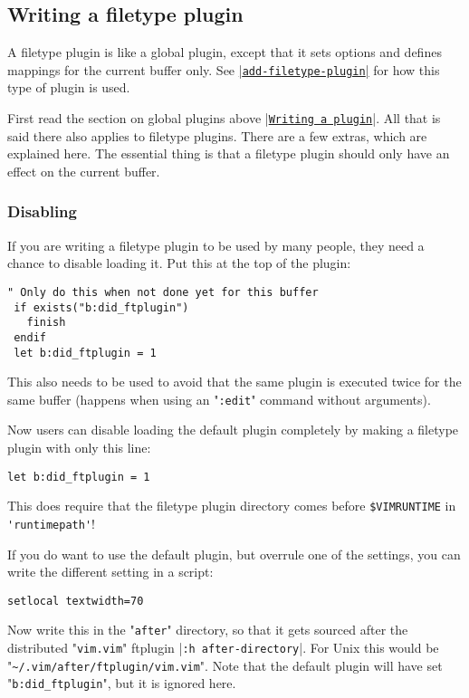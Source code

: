 \subsection{Writing a filetype plugin}
\label{write-filetype-plugin}
\label{ftplugin}
A filetype plugin is like a global plugin, except that it sets options and defines mappings for the current buffer only.
See \hyperref[add-filetype-plugin]{|\texttt{add-filetype-plugin}|} for how this type of plugin is used.

First read the section on global plugins above |\hyperref[Writing a plugin]{\texttt{Writing a plugin}}|.
All that is said there also applies to filetype plugins.
There are a few extras, which are explained here.
The essential thing is that a filetype plugin should only have an effect on the current buffer.

\subsubsection{Disabling}
If you are writing a filetype plugin to be used by many people, they need a chance to disable loading it.
Put this at the top of the plugin:

\begin{Verbatim}[samepage=true]
 " Only do this when not done yet for this buffer
 if exists("b:did_ftplugin")
   finish
 endif
 let b:did_ftplugin = 1
\end{Verbatim}

This also needs to be used to avoid that the same plugin is executed twice for the same buffer (happens when using an "\verb!:edit!" command without arguments).

Now users can disable loading the default plugin completely by making a filetype plugin with only this line:

\begin{Verbatim}[samepage=true]
 let b:did_ftplugin = 1
\end{Verbatim}

This does require that the filetype plugin directory comes before \verb!$VIMRUNTIME! in \verb!'runtimepath'!!

If you do want to use the default plugin, but overrule one of the settings, you can write the different setting in a script:

\begin{Verbatim}[samepage=true]
 setlocal textwidth=70
\end{Verbatim}

Now write this in the "\verb!after!" directory, so that it gets sourced after the distributed "\verb!vim.vim!" ftplugin |\verb!:h after-directory!|.
For Unix this would be "\verb!~/.vim/after/ftplugin/vim.vim!".
Note that the default plugin will have set "\verb!b:did_ftplugin!", but it is ignored here.

